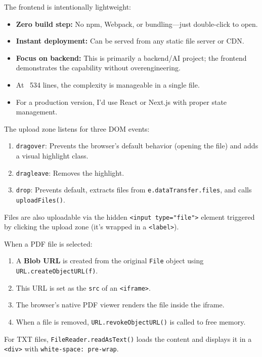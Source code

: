 \documentclass[12pt,a4paper]{article}
\begin{document}
\begin{interviewbox}
\end{interviewbox}
\begin{answerbox}
The frontend is intentionally lightweight:
\begin{itemize}
  \item \textbf{Zero build step:} No npm, Webpack, or bundling—just double-click to open.
  \item \textbf{Instant deployment:} Can be served from any static file server or CDN.
  \item \textbf{Focus on backend:} This is primarily a backend/AI project; the frontend demonstrates the capability without overengineering.
  \item At ~534 lines, the complexity is manageable in a single file.
  \item For a production version, I'd use React or Next.js with proper state management.
\end{itemize}
\end{answerbox}

\begin{interviewbox}
\end{interviewbox}
\begin{answerbox}
The upload zone listens for three DOM events:
\begin{enumerate}
  \item \texttt{dragover}: Prevents the browser's default behavior (opening the file) and adds a visual highlight class.
  \item \texttt{dragleave}: Removes the highlight.
  \item \texttt{drop}: Prevents default, extracts files from \texttt{e.dataTransfer.files}, and calls \texttt{uploadFiles()}.
\end{enumerate}
Files are also uploadable via the hidden \texttt{<input type="file">} element triggered by clicking the upload zone (it's wrapped in a \texttt{<label>}).
\end{answerbox}

\begin{interviewbox}
\end{interviewbox}
\begin{answerbox}
When a PDF file is selected:
\begin{enumerate}
  \item A \textbf{Blob URL} is created from the original \texttt{File} object using \texttt{URL.createObjectURL(f)}.
  \item This URL is set as the \texttt{src} of an \texttt{<iframe>}.
  \item The browser's native PDF viewer renders the file inside the iframe.
  \item When a file is removed, \texttt{URL.revokeObjectURL()} is called to free memory.
\end{enumerate}
For TXT files, \texttt{FileReader.readAsText()} loads the content and displays it in a \texttt{<div>} with \texttt{white-space: pre-wrap}.
\end{answerbox}
\end{document}
